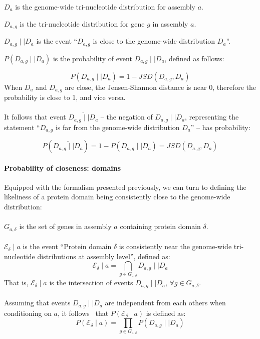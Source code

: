 \documentclass[12pt]{article}
\begin{document}
\begin{description}
	\item $D_a$ is the genome-wide tri-nucleotide distribution for assembly $a$.
	\item $D_{a,g}$ is the tri-nucleotide distribution for gene $g$ in assembly $a$.  
	\item $D_{a,g} \mid\mid D_a$ is the event ``$D_{a,g}$ is close to the genome-wide distribution $D_a$''.
	\item $P(D_{a,g} \mid\mid D_a)$ is the probability of event $D_{a,g} \mid\mid D_a$, defined as follows:
\end{description}
%
\begin{equation}
P(D_{a,g} \mid\mid D_a) = 1 - JSD(D_{a,g}, D_a)
\end{equation}
%
When $D_a$ and $D_{a,g}$ are close, the Jensen-Shannon distance is near 0, therefore the probability is close to 1, and vice versa.\\
\\
It follows that event $\overline{D_{a,g} \mid\mid D_a}$ -- the negation of $D_{a,g} \mid\mid D_a$, representing the statement ``$D_{a,g}$ is far from the genome-wide distribution $D_a$'' -- has probability:

\begin{equation}
P(\overline{D_{a,g} \mid\mid D_a}) = 1 - P(D_{a,g} \mid\mid D_a) = JSD(D_{a,g}, D_a)
\end{equation}

\paragraph{Probability of closeness: domains}
Equipped with the formalism presented previously, we can turn to defining the likeliness of a protein domain being consistently close to the genome-wide distribution:\\
\\
$G_{a, \delta}$ is the set of genes in assembly $a$ containing protein domain $\delta$.\\
\\
$\mathscr{E_{\delta}} \mid a$ is the event ``Protein domain $\delta$ is consistently near the genome-wide tri-nucleotide distributions at assembly level'', defined as:
%
\begin{equation}
\mathscr{E_{\delta}} \mid a = \bigcap\limits_{g \in G_{a, \delta}} D_{a,g} \mid\mid D_a
\end{equation}
%
That is, $\mathscr{E_{\delta}} \mid a$ is the intersection of events $D_{a,g} \mid\mid D_a$, $\forall g \in G_{a, \delta}$.\\
\\
Assuming that events $D_{a,g} \mid\mid D_a$ are independent from each others when conditioning on $a$, it follows~\cite{dupre2009new} that $P(\mathscr{E_{\delta}} \mid a)$ is defined as:
%
\begin{equation}
P(\mathscr{E_{\delta}} \mid a) = \prod\limits_{g \in G_{a, \delta}} P(D_{a,g} \mid\mid D_a)
\label{eq:assembly_probability}
\end{equation}
\end{document}
